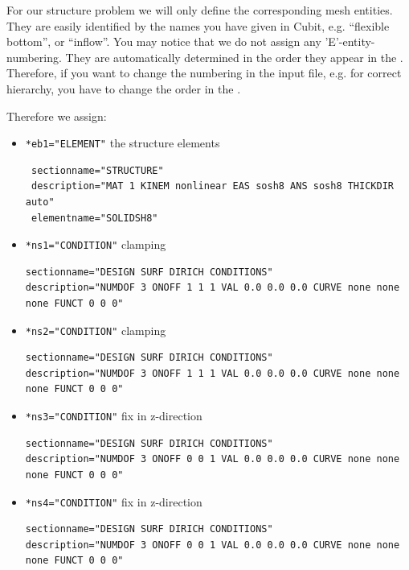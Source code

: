 For our structure problem we will only define the corresponding mesh entities. They are easily identified by the names you have given in Cubit, e.g. ``flexible bottom'', or ``inflow''. You may notice that we do not assign any 'E'-entity-numbering.
They are automatically determined in the order they appear in the \bc. Therefore, if you want to change the numbering in the \baci{} input file, e.g. for correct hierarchy, you have to change the order in the \bc.

Therefore we assign:
\begin{itemize}
 \item \verb|*eb1="ELEMENT"| \qquad the structure elements
 \begin{small} \begin{verbatim}
 sectionname="STRUCTURE"
 description="MAT 1 KINEM nonlinear EAS sosh8 ANS sosh8 THICKDIR auto"
 elementname="SOLIDSH8"
 \end{verbatim} \end{small}
 
 \item \verb|*ns1="CONDITION"| \qquad clamping
 \begin{small} \begin{verbatim}
sectionname="DESIGN SURF DIRICH CONDITIONS"
description="NUMDOF 3 ONOFF 1 1 1 VAL 0.0 0.0 0.0 CURVE none none none FUNCT 0 0 0"
 \end{verbatim} \end{small}
 
 \item \verb|*ns2="CONDITION"| \qquad clamping
 \begin{small} \begin{verbatim}
sectionname="DESIGN SURF DIRICH CONDITIONS"
description="NUMDOF 3 ONOFF 1 1 1 VAL 0.0 0.0 0.0 CURVE none none none FUNCT 0 0 0"
 \end{verbatim} \end{small}
 
 \item \verb|*ns3="CONDITION"| \qquad fix in z-direction
 \begin{small} \begin{verbatim}
sectionname="DESIGN SURF DIRICH CONDITIONS"
description="NUMDOF 3 ONOFF 0 0 1 VAL 0.0 0.0 0.0 CURVE none none none FUNCT 0 0 0"
 \end{verbatim} \end{small}
 
 \item \verb|*ns4="CONDITION"| \qquad fix in z-direction
 \begin{small} \begin{verbatim}
sectionname="DESIGN SURF DIRICH CONDITIONS"
description="NUMDOF 3 ONOFF 0 0 1 VAL 0.0 0.0 0.0 CURVE none none none FUNCT 0 0 0"
 \end{verbatim} \end{small}
 

\end{itemize}
